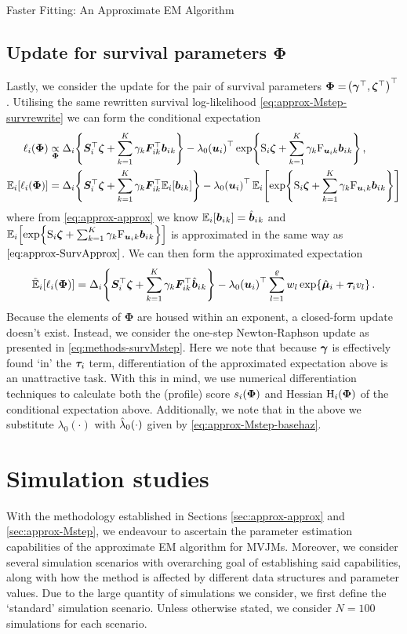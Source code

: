 \begin{chapter}{\label{cha:approx}Faster Fitting: An Approximate EM Algorithm}
  \subsection{Update for survival parameters \texorpdfstring{$\bm{\Phi}$}{gammazeta}}\label{sec:approx-Mstep-Phi}
  Lastly, we consider the update for the pair of survival parameters $\bm{\Phi}=\!\left(\bm{\gamma}^\top,\bm{\zeta}^\top\right)^\top$. Utilising the same rewritten survival log-likelihood \eqref{eq:approx-Mstep-survrewrite} we can form the conditional expectation
  \begin{align*}
      \elli{\bm{\Phi}}&\unsetp{\bm{\Phi}}\Delta_i\lbr\bm{S}_i^\top\bz+\Sk\gamma_k\bm{F}_{ik}^\top\b{_k}\rbr - \lo\lb\bm{u}_i\rb^\top\exp\lbr\mathrm{S}_i\bz + 
      \Sk\gamma_k\mathrm{F}_{\bm{u}_ik}\b{_k}\rbr,\\
      \Expi{\elli{\bm{\Phi}}}&=\Delta_i\lbr\bm{S}_i^\top\bz+\Sk\gamma_k\bm{F}_{ik}^\top\Expi{\b{_k}}\rbr - \lo\lb\bm{u}_i\rb^\top\Expi{\exp\lbr\mathrm{S}_i\bz + 
      \Sk\gamma_k\mathrm{F}_{\bm{u}_ik}\b{_k}\rbr}
  \end{align*}
  where from \eqref{eq:approx-approx} we know $\mathbb{E}_i\!\left[\bm{b}_i{_k}\right]=\hat{\bm{b}}_i{_k}$ and $\mathbb{E}_i\!\left[\exp\!\left\{\mathrm{S}_i\bm{\zeta} + \sum_{k=1}^K\gamma_k\mathrm{F}_{\bm{u}_ik}\bm{b}_i{_k}\right\}\right]$ is approximated in the same way as $\eqref{eq:approx-SurvApprox}$. We can then form the approximated expectation
  \begin{align}
      \tilde{\mathbb{E}}_i\!\left[\ell_i\!\left(\bm{\Phi}\right)\right]=\Delta_i\!\left\{\bm{S}_i^\top\bm{\zeta}+\sum_{k=1}^K\gamma_k\bm{F}_{ik}^\top\hat{\bm{b}}_i{_k}\right\}-\lambda_0\!\left(\bm{u}_i\right)^\top\sum_{l=1}^\varrho w_l\exp\!\left\{\hat{\bm{\mu}}_i+\bm{\tau}_i v_l\right\}.
  \label{eq:approx-Mstep-PhiObjective}
  \end{align}
  Because the elements of $\bm{\Phi}$ are housed within an exponent, a closed-form update doesn't exist. Instead, we consider the one-step Newton-Raphson update as presented in \eqref{eq:methods-survMstep}. Here we note that because $\bm{\gamma}$ is effectively found `in' the $\bm{\tau}_i$ term, differentiation of the approximated expectation above is an unattractive task. With this in mind, we use numerical differentiation techniques to calculate both the (profile) score $s_i\!\left(\bm{\Phi}\right)$ and Hessian $\mathrm{H}_i\!\left(\bm{\Phi}\right)$ of the conditional expectation above. Additionally, we note that in the above we substitute $\lambda_0(\cdot)$ with $\hat{\lambda}_0\!\left( \cdot\right)$ given by \eqref{eq:approx-Mstep-basehaz}.
  
  \section{Simulation studies}\label{sec:approx-simsetup-intro}
  With the methodology established in Sections \ref{sec:approx-approx} and \ref{sec:approx-Mstep}, we endeavour to ascertain the parameter estimation capabilities of the approximate EM algorithm for MVJMs. Moreover, we consider several simulation scenarios with overarching goal of establishing said capabilities, along with how the method is affected by different data structures and parameter values.
  Due to the large quantity of simulations we consider, we first define the `standard' simulation scenario. Unless otherwise stated, we consider $N=100$ simulations for each scenario.

\end{chapter}
